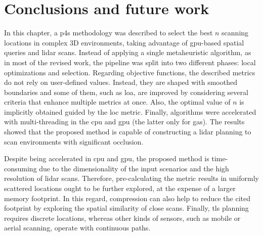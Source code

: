 \section{Conclusions and future work}

In this chapter, a \acrshort{p4s} methodology was described to select the best $n$ scanning locations in complex 3D environments, taking advantage of \acrshort{gpu}-based spatial queries and \acrshort{lidar} scans. Instead of applying a single metaheuristic algorithm, as in most of the revised work, the pipeline was split into two different phases: local optimizations and selection. Regarding objective functions, the described metrics do not rely on user-defined values. Instead, they are shaped with smoothed boundaries and some of them, such as \acrshort{loa}, are improved by considering several criteria that enhance multiple metrics at once. Also, the optimal value of $n$ is implicitly obtained guided by the \acrshort{loc} metric. Finally, algorithms were accelerated with multi-threading in the \acrshort{cpu} and \acrshort{gpu} (the latter only for \acrshort{ga}s). The results showed that the proposed method is capable of constructing a \acrshort{lidar} planning to scan environments with significant occlusion.

Despite being accelerated in \acrshort{cpu} and \acrshort{gpu}, the proposed method is time-consuming due to the dimensionality of the input scenarios and the high resolution of \acrshort{lidar} scans. Therefore, pre-calculating the metric results in uniformly scattered locations ought to be further explored, at the expense of a larger memory footprint. In this regard, compression can also help to reduce the cited footprint by exploring the spatial similarity of close scans. Finally, \acrshort{tls} planning requires discrete locations, whereas other kinds of sensors, such as mobile or aerial scanning, operate with continuous paths.  
